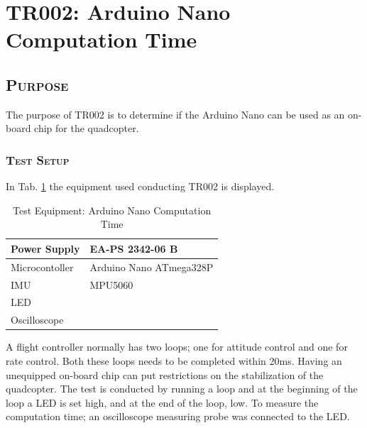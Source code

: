 
\section{TR002: Arduino Nano Computation Time}
         {}
                         
\subsection*{\textsc{\medium Purpose}}
The purpose of TR002 is to determine if the Arduino Nano can be used as an on-board chip for the quadcopter. 

\subsubsection*{\textsc{\medium Test Setup}}
In Tab. \ref{tab:tabt4} the equipment used conducting TR002 is displayed. 
\begin {table}[H]
    \begin{center}
    \caption {Test Equipment: Arduino Nano Computation Time} 
    \label{tab:tabt4} 
    \begin{tabular}{|l|l|}\hline 
        Power Supply & EA-PS 2342-06 B     \\ \hline
        Microcontoller & Arduino Nano ATmega328P \\ \hline
        IMU & MPU5060 \\ \hline
        LED & \\ \hline
        Oscilloscope & \\ \hline
        \end{tabular}
    \end{center}
\end{table}

A flight controller normally has two loops; one for attitude control and one for rate control. Both these loops needs to be completed within 20ms. Having an unequipped on-board chip can put restrictions on the stabilization of the quadcopter. The test is conducted by running a loop and at the beginning of the loop a LED is set high, and at the end of the loop, low. To measure the computation time; an oscilloscope measuring probe was connected to the LED. 


